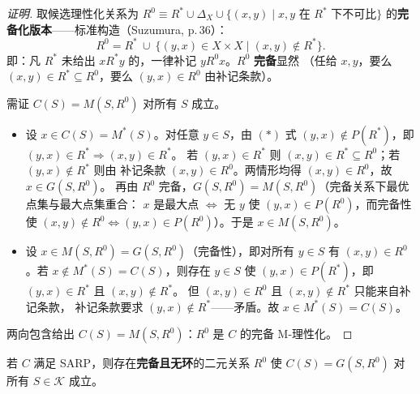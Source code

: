 \begin{proof}[证明]
取候选理性化关系为 $R^0\equiv R^*\cup\Delta_X\cup\{(x,y)\mid x,y \text{ 在 } R^*
\text{ 下不可比}\}$ 的\textbf{完备化版本}——标准构造（Suzumura, p.\,36）：
\[
R^0 = R^*\ \cup\ \{(y,x)\in X\times X \mid (x,y)\notin R^*\}.
\]
即：凡 $R^*$ 未给出 $x R^* y$ 的，一律补记 $y R^0 x$。$R^0$ \textbf{完备}显然
（任给 $x,y$，要么 $(x,y)\in R^*\subseteq R^0$，要么 $(y,x)\in R^0$ 由补记条款）。

需证 $C(S)=M(S,R^0)$ 对所有 $S$ 成立。
\begin{itemize}
  \item[$\subseteq$：] 设 $x\in C(S)=M^*(S)$。对任意 $y\in S$，由 $(\ast)$ 式
  $(y,x)\notin P(R^*)$，即 $(y,x)\in R^*\Rightarrow(x,y)\in R^*$。
  若 $(y,x)\in R^*$ 则 $(x,y)\in R^*\subseteq R^0$；若 $(y,x)\notin R^*$ 则由
  补记条款 $(x,y)\in R^0$。两情形均得 $(x,y)\in R^0$，故 $x\in G(S,R^0)$。
  再由 $R^0$ 完备，$G(S,R^0)=M(S,R^0)$（完备关系下最优点集与最大点集重合：
  $x$ 是最大点 $\iff$ 无 $y$ 使 $(y,x)\in P(R^0)$，而完备性使
  $(x,y)\notin R^0\iff(y,x)\in P(R^0)$）。于是 $x\in M(S,R^0)$。
  \item[$\supseteq$：] 设 $x\in M(S,R^0)=G(S,R^0)$（完备性），即对所有 $y\in S$
  有 $(x,y)\in R^0$。若 $x\notin M^*(S)=C(S)$，则存在 $y\in S$ 使
  $(y,x)\in P(R^*)$，即 $(y,x)\in R^*$ 且 $(x,y)\notin R^*$。
  但 $(x,y)\in R^0$ 且 $(x,y)\notin R^*$ 只能来自补记条款，
  补记条款要求 $(y,x)\notin R^*$——矛盾。故 $x\in M^*(S)=C(S)$。
\end{itemize}
两向包含给出 $C(S)=M(S,R^0)$：$R^0$ 是 $C$ 的完备 M-理性化。
\end{proof}

\begin{theorem}\label{thm:16}
若 $C$ 满足 SARP，则存在\textbf{完备且无环}的二元关系 $R^0$ 使
$C(S)=G(S,R^0)$ 对所有 $S\in\mathcal{K}$ 成立。
\end{theorem}

